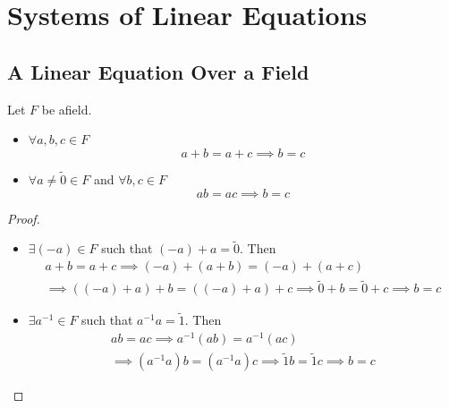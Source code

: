 
\chapter{Systems of Linear Equations}
\section{A Linear Equation Over a Field}

\begin{proposition}
    Let $F$ be afield.
    \begin{itemize}
        \item $\forall a,b,c \in F$
        \[
        a+b=a+c \implies b=c
        \]        
        \item $\forall a \neq \tilde{0} \in F$ and $\forall b,c \in F$
        \[
        ab=ac \implies b=c
        \]
         
    \end{itemize}
\end{proposition}
\begin{proof}
    \begin{itemize}
        \item $\exists \left(-a\right) \in F$ such that $\left(-a\right)+a=\tilde{0}$. Then
        \begin{align*}
        a+b=a+c \implies \left(-a\right)+\left(a+b\right)=\left(-a\right)+\left(a+c\right) \\
        \implies \left(\left(-a\right)+a\right)+b=\left(\left(-a\right)+a\right)+c \implies \tilde{0}+b=\tilde{0}+c \implies b=c
        \end{align*}
        \item $\exists a^{-1} \in F$ such that $a^{-1}a=\tilde{1}$. Then
        \begin{align*}
        ab=ac \implies a^{-1}\left(ab\right)=a^{-1}\left(ac\right) \\
        \implies \left(a^{-1}a\right)b=\left(a^{-1}a\right)c \implies \tilde{1}b=\tilde{1}c \implies b=c
        \end{align*} 
    \end{itemize}
\end{proof}

